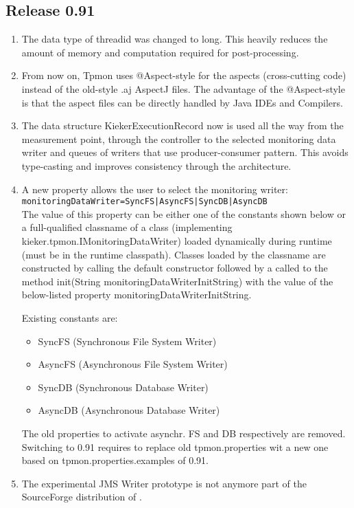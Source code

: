 \documentclass{scrartcl}
\begin{document}
\subsection{Release 0.91}
\begin{enumerate}
\item The data type of threadid was changed to long. This heavily reduces the amount of memory and computation required for post-processing.
\item From now on, Tpmon uses  @Aspect-style for the aspects (cross-cutting code) instead of the old-style
    .aj AspectJ files. The advantage of the @Aspect-style is that the aspect files can be directly handled by Java IDEs and Compilers.
\item The data structure KiekerExecutionRecord now is used all the way from the measurement point, through the controller to the selected monitoring data writer and queues of writers that use producer-consumer pattern. This avoids type-casting and improves consistency through the architecture.
\item  A new property allows the user to select the monitoring writer: \\
    \verb.monitoringDataWriter=SyncFS|AsyncFS|SyncDB|AsyncDB. \\
The value of this property can be either one of the constants shown below or a full-qualified
classname of a class (implementing kieker.tpmon.IMonitoringDataWriter) loaded
dynamically during runtime (must be in the runtime classpath). Classes loaded by
the classname are constructed by calling the default constructor followed by a
called to the method init(String monitoringDataWriterInitString) with the
value of the below-listed property monitoringDataWriterInitString.

Existing constants are:
\begin{itemize}
\item SyncFS (Synchronous File System Writer)
\item AsyncFS (Asynchronous File System Writer)
\item SyncDB (Synchronous Database Writer)
\item AsyncDB (Asynchronous Database Writer)
\end{itemize}
The old properties to activate asynchr. FS and DB respectively are removed. Switching to
\tpmon{} 0.91 requires to replace old tpmon.properties wit a new one based on tpmon.properties.examples of 0.91.

\item The experimental JMS Writer prototype is not anymore part of the SourceForge distribution of \tpmon{}.
\end{enumerate}
\end{document}
